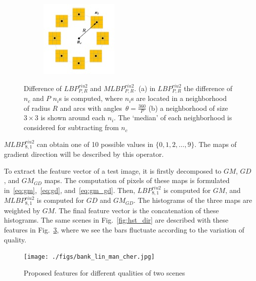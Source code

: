 \begin{figure}
\begin{subfigure}[b]{0.3\textwidth}
         \includegraphics[width= \textwidth]{./figs/lbp_gu}
         \caption{}
         \label{fig:two_lbps_gu}
     \end{subfigure}
     \caption{Difference of $LBP^{riu2}_{P, R}$ and $MLBP^{riu2}_{P, R}$. (a) in $LBP^{riu2}_{P, R}$ the difference of $n_c$ and $P$ $n_i$s is computed, where $n_i$s are located in a neighborhood of radius $R$ and arcs with angles~$\theta=\frac{360}{P}$ (b) a neighborhood of size $3\times 3$ is shown around each $n_i$. The `median' of each neighborhood is considered for subtracting from $n_c$}
        \label{fig:two_lbps}
\end{figure}

$MLBP^{riu2}_{8, 1}$ can obtain one of 10 possible values in $\{0, 1, 2, \ldots, 9\}$. The maps of gradient direction will be described by this operator.

To extract the feature vector of a test image, it is firstly decomposed to $GM$, $GD$, and $GM_{GD}$ maps. The computation of pixels of these maps is formulated in~\ref{eq:gm},~\ref{eq:gd}, and~\ref{eq:gm_gd}. Then, $LBP^{riu2}_{8, 1}$ is computed for $GM$, and $MLBP^{riu2}_{8, 1}$ is computed for $GD$ and $GM_{GD}$. The histograms of the three maps are weighted by $GM$. The final feature vector is the concatenation of these histograms. The same scenes in Fig.~\ref{fig:hst_dir} are described with these features in Fig.~\ref{fig:hst_feat}, where we see the bars fluctuate according to the variation of quality.
\begin{figure}
         \centering
         \texttt{[image: ./figs/bank\_lin\_man\_cher.jpg]}
     \caption{Proposed features for different qualities of two scenes}
        \label{fig:hst_feat}
\end{figure}

